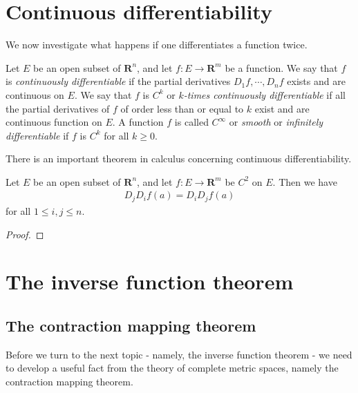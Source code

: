 \section{Continuous differentiability}

We now investigate what happens if one differentiates a function twice.

\begin{definition}
    Let $E$ be an open subset of $\mathbf{R}^n$, and let $f : E \to \mathbf{R}^m$ be a function. We say that $f$ is \emph{continuously differentiable} if the partial derivatives $D_1f, \cdots, D_nf$ exists and are continuous on $E$. We say that $f$ is $C^k$ or \emph{$k$-times continuously differentiable} if all the partial derivatives of $f$ of order less than or equal to $k$ exist and are continuous function on $E$. A function $f$ is called $C^\infty$ or \emph{smooth} or \emph{infinitely differentiable} if $f$ is $C^k$ for all $k \geq 0$.
\end{definition}

There is an important theorem in calculus concerning continuous differentiability.

\begin{theorem}
    Let $E$ be an open subset of $\mathbf{R}^n$, and let $f : E \to \mathbf{R}^m$ be $C^2$ on $E$. Then we have
    \begin{align*}
        D_jD_if(a) = D_iD_jf(a)
    \end{align*}
    for all $1 \leq i,j \leq n$.
\end{theorem}

\begin{proof}
    
\end{proof}

\begin{theorem}
    
\end{theorem}

\section{The inverse function theorem}
\subsection{The contraction mapping theorem}

Before we turn to the next topic - namely, the inverse function theorem - we need to develop a useful fact from the theory of complete metric spaces, namely the contraction mapping theorem.

